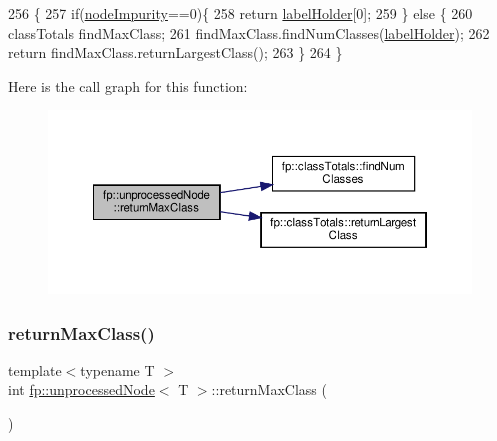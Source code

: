 \begin{DoxyCode}
256                                            \{
257                     \textcolor{keywordflow}{if}(\hyperlink{classfp_1_1unprocessedNode_a5bb6906b09625f7893bf0ffd512b1714}{nodeImpurity}==0)\{
258                         \textcolor{keywordflow}{return} \hyperlink{classfp_1_1unprocessedNode_a2aa2f9dcba0b0a859457ed22e147f698}{labelHolder}[0];
259                     \} \textcolor{keywordflow}{else} \{
260                         classTotals findMaxClass;
261                         findMaxClass.findNumClasses(\hyperlink{classfp_1_1unprocessedNode_a2aa2f9dcba0b0a859457ed22e147f698}{labelHolder});
262                         \textcolor{keywordflow}{return} findMaxClass.returnLargestClass();
263                     \}
264                 \}
\end{DoxyCode}
Here is the call graph for this function\+:
\nopagebreak
\begin{figure}[H]
\begin{center}
\leavevmode
\includegraphics[width=350pt]{classfp_1_1unprocessedNode_af038553809a2e6d1cbe04adaba1c6b21_cgraph}
\end{center}
\end{figure}
\mbox{\label{classfp_1_1unprocessedNode_af038553809a2e6d1cbe04adaba1c6b21}} 
\subsubsection{\texorpdfstring{return\+Max\+Class()}{returnMaxClass()}\hspace{0.1cm}{\footnotesize\ttfamily [2/2]}}
{\footnotesize\ttfamily template$<$typename T $>$ \\
int \hyperlink{classfp_1_1unprocessedNode}{fp\+::unprocessed\+Node}$<$ T $>$\+::return\+Max\+Class (\begin{DoxyParamCaption}{ }\end{DoxyParamCaption})\hspace{0.3cm}{\ttfamily [inline]}}



